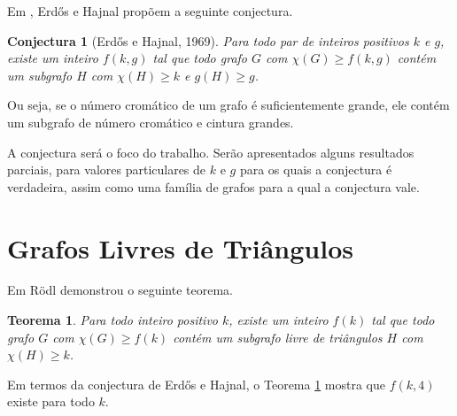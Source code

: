 \documentclass{article}
\newtheorem{teorema}{Teorema}[section]
\newtheorem{conjectura}{Conjectura}
\begin{document}
Em \cite{erdos1969conj}, Erd\H{o}s e Hajnal propõem a seguinte conjectura.

\begin{conjectura}[Erd\H{o}s e Hajnal, 1969]
Para todo par de inteiros positivos $k$ e $g$, existe um inteiro $f(k,g)$ tal que todo grafo $G$ com $\chi(G) \geq f(k,g)$ contém um subgrafo $H$ com $\chi(H) \geq k$ e $g(H) \geq g$.
\end{conjectura}

Ou seja, se o número cromático de um grafo é suficientemente grande, ele contém um subgrafo de número cromático e cintura grandes.

A conjectura será o foco do trabalho. Serão apresentados alguns resultados parciais, para valores particulares de $k$ e $g$ para os quais a conjectura é verdadeira, assim como uma família de grafos para a qual a conjectura vale.

\section{Grafos Livres de Triângulos}
Em \cite{rodl1977chromatic} R\"{o}dl demonstrou o seguinte teorema.

\begin{teorema}\label{rodlthm}
Para todo inteiro positivo $k$, existe um inteiro $f(k)$ tal que todo grafo $G$ com $\chi(G) \geq f(k)$ contém um subgrafo livre de triângulos $H$ com $\chi(H) \geq k$.
\end{teorema}

Em termos da conjectura de Erd\H{o}s e Hajnal, o Teorema \ref{rodlthm} mostra que $f(k,4)$ existe para todo $k$.
\end{document}
